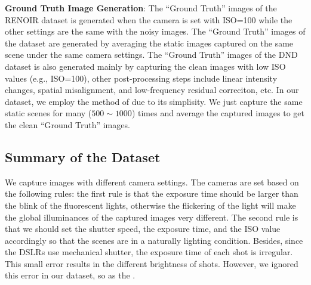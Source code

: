 \textbf{Ground Truth Image Generation}: The ``Ground Truth'' images of the RENOIR dataset \cite{RENOIR2014} is generated when the camera is set with ISO=100 while the other settings are the same with the noisy images. The ``Ground Truth'' images of the dataset \cite{crosschannel2016} are generated by averaging the static images captured on the same scene under the same camera settings. The ``Ground Truth'' images of the DND dataset \cite{dnd2017} is also generated mainly by capturing the clean images with low ISO values (e.g., ISO=100), other post-processing steps include   linear intensity changes, spatial misalignment, and low-frequency residual correciton, etc. In our dataset, we employ the method of \cite{crosschannel2016} due to its simplisity. We just capture the same static scenes for many ($500\sim1000$) times and average the captured images to get the clean ``Ground Truth'' images.
 
\subsection{Summary of the Dataset}

We capture images with different camera settings. The cameras are set based on the following rules: the first rule is that the exposure time should be larger than the blink of the fluorescent lights, otherwise the flickering of the light will make the global illuminances of the captured images very different. The second rule is that we should set the shutter speed, the exposure time, and the ISO value accordingly so that the scenes are in a naturally lighting condition. Besides, since the DSLRs use mechanical shutter, the exposure time of each shot is irregular. This small error results in the different brightness of shots. However, we ignored this error in our dataset, so as the \cite{crosschannel2016}.

